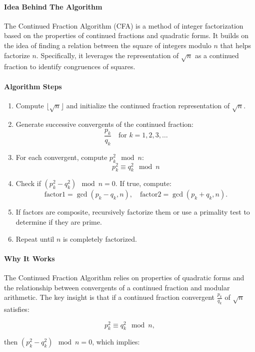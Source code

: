 \documentclass[12pt]{report}
\begin{document}
\paragraph{Idea Behind The Algorithm}

The Continued Fraction Algorithm (CFA) is a method of integer factorization based on the properties of continued fractions and quadratic forms. It builds on the idea of finding a relation between the square of integers modulo $n$ that helps factorize $n$. Specifically, it leverages the representation of $\sqrt{n}$ as a continued fraction to identify congruences of squares.

\paragraph{Algorithm Steps}

\begin{enumerate}
    \item Compute $\lfloor \sqrt{n} \rfloor$ and initialize the continued fraction representation of $\sqrt{n}$.
    \item Generate successive convergents of the continued fraction:
\[
    \frac{p_k}{q_k} \quad \text{for } k = 1, 2, 3, \ldots
\]
    \item For each convergent, compute $p_k^2 \mod n$:
\[
    p_k^2 \equiv q_k^2 \mod n
\]
    \item Check if $(p_k^2 - q_k^2) \mod n = 0$. If true, compute:
\[
    \text{factor1} = \gcd(p_k - q_k, n), \quad \text{factor2} = \gcd(p_k + q_k, n).
\]
    \item If factors are composite, recursively factorize them or use a primality test to determine if they are prime.
    \item Repeat until $n$ is completely factorized.
\end{enumerate}

\paragraph{Why It Works}

The Continued Fraction Algorithm relies on properties of quadratic forms and the relationship between convergents of a continued fraction and modular arithmetic. The key insight is that if a continued fraction convergent $\frac{p_k}{q_k}$ of $\sqrt{n}$ satisfies:

\[
p_k^2 \equiv q_k^2 \mod n,
\]

then $(p_k^2 - q_k^2) \mod n = 0$, which implies:
\end{document}
